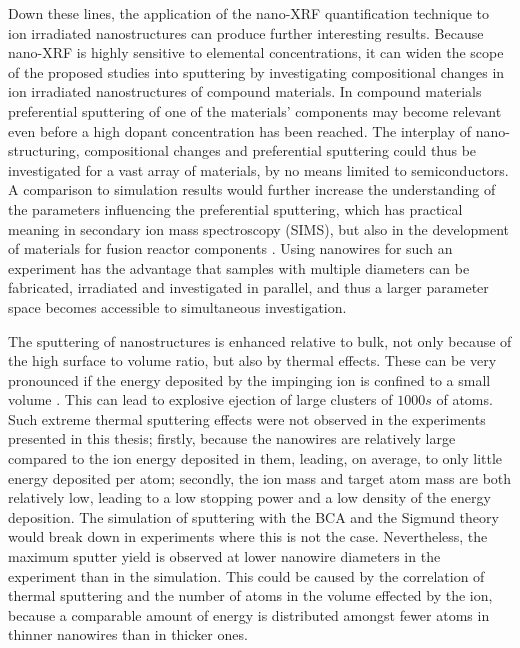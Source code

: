 Down these lines, the application of the nano-XRF quantification technique to ion irradiated nanostructures can produce further interesting results. Because nano-XRF is highly sensitive to elemental concentrations, it can widen the scope of the proposed studies into sputtering by investigating compositional changes in ion irradiated nanostructures of compound materials. In compound materials preferential sputtering of one of the materials' components may become relevant even before a high dopant concentration has been reached. The interplay of nano-structuring, compositional changes and preferential sputtering could thus be investigated for a vast array of materials, by no means limited to semiconductors. A comparison to simulation results would further increase the understanding of the parameters influencing the preferential sputtering, which has practical meaning in secondary ion mass spectroscopy (SIMS), but also in the development of materials for fusion reactor components \cite{kelly_attempt_1978,roth_sputtering_1990,kenmotsu_effect_2011}. Using nanowires for such an experiment has the advantage that samples with multiple diameters can be fabricated, irradiated and investigated in parallel, and thus a larger parameter space becomes accessible to simultaneous investigation.

The sputtering of nanostructures is enhanced relative to bulk, not only because of the high surface to volume ratio, but also by thermal effects. These can be very pronounced if the energy deposited by the impinging ion is confined to a small volume \cite{greaves_enhanced_2013,ilinov_sputtering_2014,nietiadi_sputtering_2014,anders_sputtering_2015,urbassek_sputter_2015}. This can lead to explosive ejection of large clusters of $1000s$ of atoms. Such extreme thermal sputtering effects were not observed in the experiments presented in this thesis; firstly, because the nanowires are relatively large compared to the ion energy deposited in them, leading, on average, to only little energy deposited per atom; secondly, the ion mass and target atom mass are both relatively low, leading to a low stopping power and a low density of the energy deposition. The simulation of sputtering with the BCA and the Sigmund theory would break down in experiments where this is not the case. Nevertheless, the maximum sputter yield is observed at lower nanowire diameters in the experiment than in the simulation. This could be caused by the correlation of thermal sputtering and the number of atoms in the volume effected by the ion, because a comparable amount of energy is distributed amongst fewer atoms in thinner nanowires than in thicker ones.

